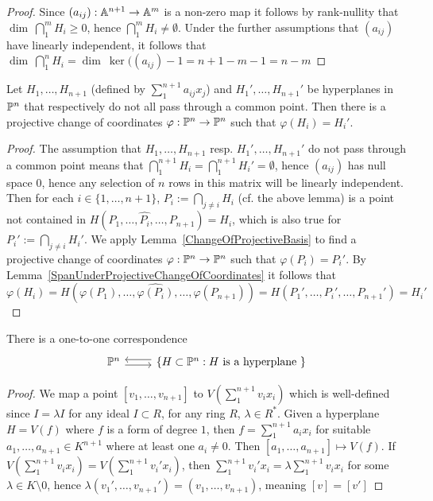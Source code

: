     \begin{proof}
        Since $(a_{ij}): \mathbb{A}^{n+1}\rightarrow \mathbb{A}^m$ is a non-zero map it follows by rank-nullity that $\dim\ \bigcap_1^m H_i \geq 0$, hence $\bigcap_1^m H_i\neq \emptyset$. Under the further assumptions that $(a_{ij})$ have linearly independent, it follows that $\dim \ \bigcap_1^n H_i = \dim \ \ker((a_{ij})-1=n+1-m-1=n-m $
    \end{proof}
    \begin{lemma}\label{ChangeOfCoordinatesFOrHyperplanes}
        Let $H_1,\dots,H_{n+1}$ (defined by $\sum_1^{n+1} a_{ij}x_j$) and $H_1',\dots,H_{n+1}'$ be hyperplanes in $\mathbb{P}^n$ that respectively do not all pass through a common point. Then there is a projective change of coordinates $\varphi : \mathbb{P}^n \rightarrow \mathbb{P}^n$ such that $\varphi(H_i)=H_i'$.
    \end{lemma}
    \begin{proof}
        The assumption that $H_1,\dots,H_{n+1}$ resp. $H_1',\dots , H_{n+1}'$ do not pass through a common point means that $\bigcap_1^{n+1} H_i = \bigcap_1^{n+1} H_i' = \emptyset$, hence $(a_{ij})$ has null space $0$, hence any selection of $n$ rows in this matrix will be linearly independent. Then for each $i\in \{1,\dots,n+1\}$, $P_i:= \bigcap_{j\neq i} H_i$ (cf. the above lemma) is a point not contained in $H(P_1,\dots,\widehat{P_i},\dots,P_{n+1})=H_i$, which is also true for $P_i' := \bigcap_{j\neq i} H_i'$. We apply Lemma~\ref{ChangeOfProjectiveBasis} to find a projective change of coordinates $\varphi: \mathbb{P}^n \rightarrow \mathbb{P}^n$ such that $\varphi(P_i) = P_i'$. By Lemma~\ref{SpanUnderProjectiveChangeOfCoordinates} it follows that 
        $$\varphi(H_i)=H(\varphi(P_1),\dots, \widehat{\varphi(P_i)},\dots, \varphi(P_{n+1}))=H(P_1',\dots,P_i',\dots,P_{n+1}')=H_i'$$
    \end{proof}
    \begin{proposition}
        There is a one-to-one correspondence
        $$\begin{tikzcd}
            \Pp^n \arrow[r,shift right]  & \left\{H\subset \Pp^n : H \text{ is a hyperplane }\right\} \arrow[l, shift right]
        \end{tikzcd}$$
    \end{proposition}
    \begin{proof}
        We map a point $[v_1,\dots,v_{n+1}]$ to $V\left(\sum_1^{n+1} v_ix_i\right)$ which is well-defined since $I=\lambda I$ for any ideal $I\subset R$, for any ring $R$, $\lambda \in R^\ast$. Given a hyperplane $H=V(f)$ where $f$ is a form of degree $1$, then $f=\sum_1^{n+1} a_ix_i$ for suitable $a_1,\dots,a_{n+1}\in K^{n+1}$ where at least one $a_i\neq 0$. Then $[a_1,\dots,a_{n+1}]\mapsto V(f)$. If $V\left(\sum_1^{n+1} v_ix_i\right)=V\left(\sum_1^{n+1} v_i'x_i\right)$, then $\sum_1^{n+1} v_i'x_i = \lambda \sum_1^{n+1} v_ix_i$ for some $\lambda \in K\setminus 0$, hence $\lambda ( v_1',\dots,v_{n+1}') = (v_1,\dots,v_{n+1})$, meaning $[v]=[v']$  
    \end{proof}
